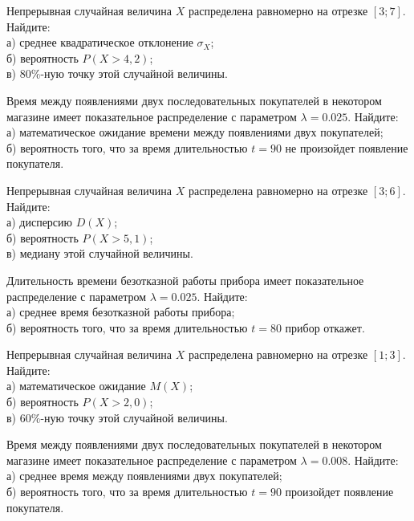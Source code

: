 \vfill

\newpage\setcounter{zad}{0}

\z Непрерывная случайная величина $X$ распределена равномерно на отрезке $[3; 7]$. Найдите: \\ \quad а) среднее квадратическое отклонение $\sigma_X$; \\ \quad б) вероятность $P(X>4{,}2)$; \\ \quad в) $80\%$-ную точку этой случайной величины.


\vfill

\z Время между появлениями двух последовательных покупателей в некотором магазине имеет показательное распределение с параметром $\lambda = 0.025$. Найдите: \\ \quad а) математическое ожидание времени между появлениями двух покупателей; \\ \quad б) вероятность того, что за время длительностью $t = 90$ не произойдет появление покупателя.
 

\vfill

\newpage\setcounter{zad}{0}

\z Непрерывная случайная величина $X$ распределена равномерно на отрезке $[3; 6]$. Найдите: \\ \quad а) дисперсию $D(X)$; \\ \quad б) вероятность $P(X>5{,}1)$; \\ \quad в) медиану этой случайной величины.


\vfill

\z Длительность времени безотказной работы прибора имеет показательное распределение с параметром $\lambda = 0.025$. Найдите: \\ \quad а) среднее время безотказной работы прибора; \\ \quad б) вероятность того, что за время длительностью $t = 80$ прибор  откажет.
 

\vfill

\newpage\setcounter{zad}{0}

\z Непрерывная случайная величина $X$ распределена равномерно на отрезке $[1; 3]$. Найдите: \\ \quad а) математическое ожидание $M(X)$; \\ \quad б) вероятность $P(X>2{,}0)$; \\ \quad в) $60\%$-ную точку этой случайной величины.


\vfill

\z Время между появлениями двух последовательных покупателей в некотором магазине имеет показательное распределение с параметром $\lambda = 0.008$. Найдите: \\ \quad а) среднее время между появлениями двух покупателей; \\ \quad б) вероятность того, что за время длительностью $t = 90$  произойдет появление покупателя.
 

